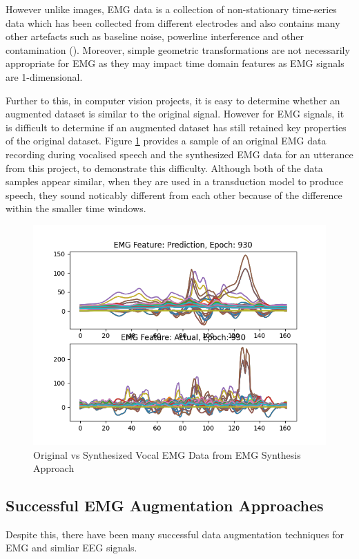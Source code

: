 However unlike images, EMG data is a collection of non-stationary
time-series data which has been collected from different electrodes
and also contains many other artefacts such as baseline noise,
powerline interference and other contamination (\cite{semg_filtering}).
Moreover, simple geometric transformations are not necessarily appropriate
for EMG as they may impact time domain features as EMG signals are
1-dimensional.

Further to this, in computer vision projects, it is easy to determine whether
an augmented dataset is similar to the original signal. However for EMG
signals, it is difficult to determine if an augmented dataset has still
retained key properties of the original dataset.
Figure \ref{fig:real-vs-pred-emg} provides a sample of an original
EMG data recording during vocalised speech and the synthesized EMG
data for an utterance from this project, to demonstrate this difficulty.
Although both of the data samples appear similar, when they are used in
a transduction model to produce speech, they sound noticably different from
each other because of the difference within the smaller time windows.

\begin{figure}[hbtp]
    \caption{Original vs Synthesized Vocal EMG Data from EMG Synthesis Approach}
    \label{fig:real-vs-pred-emg}
    \centering
    \includegraphics[width=0.75\linewidth]{graphics/emg_augment/real_vs_synth.png}
\end{figure}

\subsection{Successful EMG Augmentation Approaches}

Despite this, there have been many successful data augmentation techniques
for EMG and simliar EEG signals.

